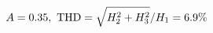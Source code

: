 \documentclass[preview]{standalone}
\begin{document}
\begin{align*}
\special{dvisvgm:raw <g id='unique000'>}A=0.35,\ \text{THD}=\sqrt{H_2^2+H_3^2}/H_1=6.9\%\special{dvisvgm:raw </g>}
\end{align*}
\end{document}
